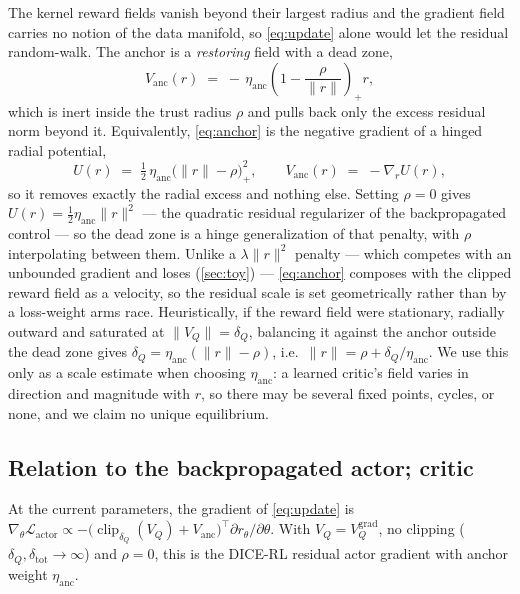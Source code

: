 The kernel reward fields vanish beyond their largest radius and the
gradient field carries no notion of the data manifold, so
\cref{eq:update} alone would let the residual random-walk. The anchor
is a \emph{restoring} field with a dead zone,
\begin{equation}
  V_{\mathrm{anc}}(r) \;=\; -\,\eta_{\mathrm{anc}}
  \left(1 - \frac{\rho}{\|r\|}\right)_{\!+} r ,
  \label{eq:anchor}
\end{equation}
which is inert inside the trust radius $\rho$ and pulls back only the
excess residual norm beyond it. Equivalently, \cref{eq:anchor} is the
negative gradient of a hinged radial potential,
\begin{equation}
  U(r) \;=\; \tfrac{1}{2}\,\eta_{\mathrm{anc}}\big(\|r\| - \rho\big)_{+}^{2},
  \qquad V_{\mathrm{anc}}(r) \;=\; -\nabla_r U(r),
  \label{eq:anchor-potential}
\end{equation}
so it removes exactly the radial excess and nothing else. Setting $\rho = 0$
gives $U(r) = \tfrac{1}{2}\eta_{\mathrm{anc}}\|r\|^{2}$ --- the quadratic
residual regularizer of the backpropagated control --- so the dead zone is a
hinge generalization of that penalty, with $\rho$ interpolating between them. Unlike a $\lambda\|r\|^2$ penalty ---
which competes with an unbounded gradient and loses
(\cref{sec:toy}) --- \cref{eq:anchor} composes with the clipped reward
field as a velocity, so the residual scale is set geometrically rather than
by a loss-weight arms race. Heuristically, if the reward field were
stationary, radially outward and saturated at $\|V_Q\| = \delta_Q$, balancing
it against the anchor outside the dead zone gives
$\delta_Q = \eta_{\mathrm{anc}}(\|r\| - \rho)$, i.e.\ $\|r\| = \rho +
\delta_Q/\eta_{\mathrm{anc}}$. We use this only as a scale estimate when
choosing $\eta_{\mathrm{anc}}$: a learned critic's field varies in direction
and magnitude with $r$, so there may be several fixed points, cycles, or
none, and we claim no unique equilibrium.

\subsection{Relation to the backpropagated actor; critic}
\label{sec:critic}

\begin{proposition}
\label{prop:equiv}
At the current parameters, the gradient of \cref{eq:update} is
$\nabla_\theta \mathcal{L}_{\mathrm{actor}} \propto
-\big(\operatorname{clip}_{\delta_Q}(V_Q) + V_{\mathrm{anc}}\big)^{\!\top}
\partial r_\theta / \partial \theta$. With
$V_Q = V_Q^{\mathrm{grad}}$, no clipping
($\delta_Q, \delta_{\mathrm{tot}} \to \infty$) and $\rho = 0$, this is
the DICE-RL residual actor gradient with anchor weight
$\eta_{\mathrm{anc}}$.
\end{proposition}

